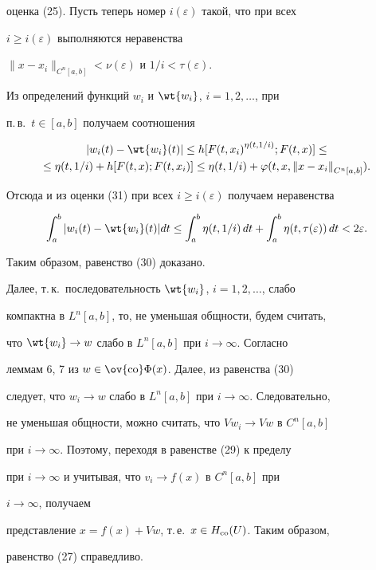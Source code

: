 \begin{pf}
оценка (25). Пусть теперь номер $i(\varepsilon)$ такой, что при всех


$i\ge i(\varepsilon)$ выполняются неравенства


$\|x-x_i\|_{C^n[a,b]}<\nu(\varepsilon)$ и $1/i<\tau(\varepsilon)$.


Из определений функций $w_i$ и $\wt{w_i}$, $i=1,2,\dotsc$, при


п.\,в.~$t\in[a,b]$ получаем соотношения


\begin{multline*}


|w_i(t)-\wt{w_i}(t)|\le h[{F(t,x_i)}^{\eta(t,1/i)};F(t,x)]\le\\


\le\eta(t,1/i)+h[F(t,x);F(t,x_i)]\le\eta(t,1/i)+


\varphi(t,x,{\|x-x_i\|}_{C^n[a,b]}).


\end{multline*}


Отсюда и из оценки (31) при всех $i\ge i(\varepsilon)$ получаем неравенства


$$


\int_a^b|w_i(t)-\wt{w_i}(t)|dt\le


\int_a^b\eta(t,1/i)\,dt+


\int_a^b\eta(t,\tau(\varepsilon))\,dt<2\varepsilon.


$$


Таким образом, равенство (30) доказано.





Далее, т.\,к.~последовательность $\wt{w_i}$, $i=1,2,\dotsc$, слабо


компактна в $L^n[a,b]$, то, не уменьшая общности, будем считать,


что $\wt{w_i}\to w$ слабо в $L^n[a,b]$ при $i\to\infty$. Согласно


леммам 6, 7 из \cite{1}\; $w\in\ov{\co}\Phi(x)$. Далее, из равенства (30)


следует, что $w_i\to w$ слабо в $L^n[a,b]$ при $i\to\infty$. Следовательно,


не уменьшая общности, можно считать, что $Vw_i\to Vw$ в $C^n[a,b]$


при $i\to\infty$. Поэтому, переходя в равенстве (29) к пределу


при $i\to\infty$ и учитывая, что $v_i\to f(x)$ в $C^n[a,b]$ при


$i\to\infty$, получаем


представление $x=f(x)+Vw$, т.\,е.~$x\in H_{\operatorname{co}}(U)$. Таким образом,


равенство (27) справедливо.


\end{pf}





